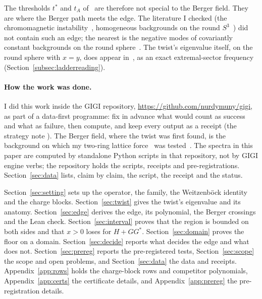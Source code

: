\documentclass[11pt]{article}
\theoremstyle{definition}
\theoremstyle{remark}
\begin{document}
The thresholds $t^*$ and $t_A$ of~\cite{davisfloor2026} are therefore not special to the Berger field. They are where
the Berger path meets the edge. The literature I checked (the chromomagnetic
instability~\cite{nielsenolesen1978,savvidy1977}, homogeneous backgrounds on the round
$S^3$~\cite{avramidicollopy2012,klc2021}) did not contain such an edge; the nearest is the negative modes of covariantly
constant backgrounds on the round sphere~\cite{avramidicollopy2012}. The twist's eigenvalue itself, on the round sphere
with $x=y$, does appear in~\cite{klc2021}, as an exact extremal-sector frequency (Section~\ref{subsec:ladderreading}).

\paragraph{How the work was done.} I did this work inside the \textsc{GIGI} repository,
\url{https://github.com/nurdymuny/gigi}, as part of a data-first programme: fix in advance what would count as success
and what as failure, then compute, and keep every output as a receipt (the strategy note
). The Berger field, where the twist was first found, is the
background on which my two-ring lattice force~\cite{davisrtc} was tested~\cite{davisfloor2026}. The spectra in this paper
are computed by standalone Python scripts in that repository, not by \textsc{GIGI} engine verbs; the repository holds the
scripts, receipts and pre-registrations. Section~\ref{sec:data} lists, claim by claim, the script, the receipt and the status.

Section~\ref{sec:setting} sets up the operator, the family, the Weitzenb\"ock identity and the charge blocks.
Section~\ref{sec:twist} gives the twist's eigenvalue and its anatomy. Section~\ref{sec:edge} derives the edge, its
polynomial, the Berger crossings and the Lean check. Section~\ref{sec:interval} proves that the region is bounded on
both sides and that $x>0$ loses for $H+GG^*$. Section~\ref{sec:domain} proves the floor on a domain.
Section~\ref{sec:decide} reports what decides the edge and what does not. Section~\ref{sec:prereg} reports the
pre-registered tests, Section~\ref{sec:scope} the scope and open problems, and Section~\ref{sec:data} the data and
receipts. Appendix~\ref{app:rows} holds the charge-block rows and competitor polynomials, Appendix~\ref{app:certs} the
certificate details, and Appendix~\ref{app:prereg} the pre-registration details.

\end{document}
